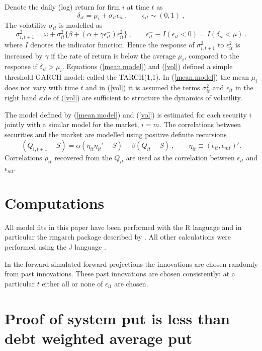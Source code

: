 \documentclass[authoryear]{elsarticle}
\newcommand{\eps}{\epsilon}
\newcommand{\eref}[1]{(\ref{#1})}
\newcommand{\cq}{\ , \qquad}
\newcommand{\be}[1]{\begin{equation}\label{#1}}
\newcommand{\ee}{\end{equation}}
\begin{document}
Denote the daily (log) return for firm $i$ at time $t$ as
\newcommand{\vareps}{\varepsilon}
\be{mean.model}
\delta_{it}=\mu_i+\sigma_{it}\eps_{it}\cq \eps_{it}\sim (0,1)\ ,
\ee
The volatility $\sigma_{it}$ is modelled as
\be{vol}
\sigma_{i,t+1}^2 = \omega+ \sigma^2_{it}\{\beta+(\alpha+\gamma \eps^-_{it})\eps_{it}^2\}  \cq  \eps^-_{it}\equiv I(\eps_{it}<0)=I(\delta_{it}<\mu)\ .
\ee
where $I$ denotes the indicator function.  Hence the response of $\sigma_{i,t+1}^2$ to $\eps_{it}^2$  is increased by $\gamma$   if
the rate of return is below the average $\mu_i$, compared to the response if $\delta_{it}>\mu_i$.  Equations \eref{mean.model} and \eref{vol} defined a simple threshold GARCH model:  called the TARCH(1,1).   In \eref{mean.model} the mean $\mu_i$ does not vary with time $t$ and in \eref{vol} it is assumed the terms  $\sigma_{it}^2$ and $\eps_{it}$ in the right hand side of \eref{vol} are sufficient to structure the dynamics of volatility. 

The model defined by \eref{mean.model} and \eref{vol} is estimated  for each security $i$ jointly with  a similar model for  the market,  $i=m$.   The correlations between securities and the market are modelled using  positive definite recursions   \citep{engle2002dynamic}
$$
(Q_{i,t+1}-S) = \alpha (\eta_{it}\eta_{it}'-S) + \beta (Q_{it}-S)\cq \eta_{it}\equiv(\eps_{it},\eps_{mt})' .
$$
Correlations $\rho_{it}$ recovered from the $Q_{it}$ are used as the correlation between $\eps_{it}$ and $\eps_{mt}$.

\section{Computations}

All model fits in this paper have been performed with the R language \citep{R-Development-Core-Team:2008aa} and in particular the rmgarch package described by \cite{ghalanos2012rmgarch}.  All other calculations were performed using the J language \citep{iverson2003j}.

In the forward simulated forward projections the  innovations are chosen randomly from past innovations.   These past innovations are chosen consistently:  at a particular $t$ either all or none of $\eps_{it}$ are chosen.

\section{Proof of system put is less   than debt weighted average put}\label{proof}
\end{document}
